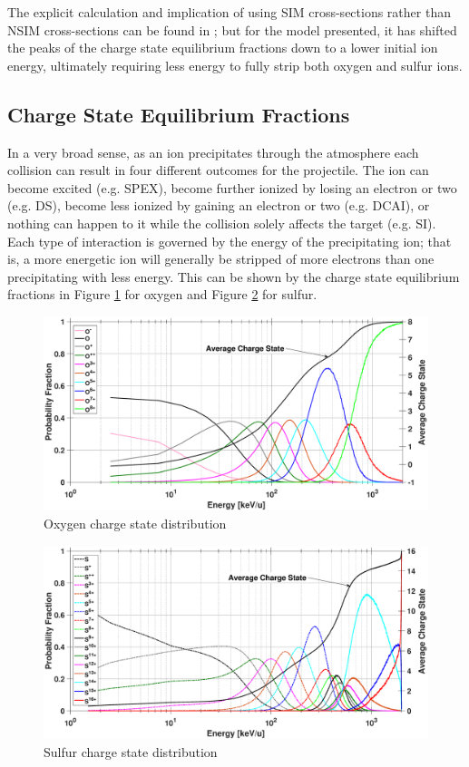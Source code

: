 \documentclass[draft]{agujournal2018}
\begin{document}
The explicit calculation and implication of using SIM cross-sections rather than NSIM cross-sections can be found in \citet{schultz2018}; but for the model presented, it has shifted the peaks of the charge state equilibrium fractions down to a lower initial ion energy, ultimately requiring less energy to fully strip both oxygen and sulfur ions.

\subsection{Charge State Equilibrium Fractions}

In a very broad sense, as an ion precipitates through the atmosphere each collision can result in four different outcomes for the projectile.
The ion can become excited (e.g. SPEX), become further ionized by losing an electron or two (e.g. DS), become less ionized by gaining an electron or two (e.g. DCAI), or nothing can happen to it while the collision solely affects the target (e.g. SI).
Each type of interaction is governed by the energy of the precipitating ion; that is, a more energetic ion will generally be stripped of more electrons than one precipitating with less energy.
This can be shown by the charge state equilibrium fractions in Figure \ref{fig:CSDoxy} for oxygen and Figure \ref{fig:CSDsul} for sulfur.

\begin{figure}[ht]
\centering
\includegraphics[width=\textwidth]{Figures/CSDoxy.eps}
\caption{Oxygen charge state distribution}
\label{fig:CSDoxy}
\end{figure}

\begin{figure}[ht]
\centering
\includegraphics[width=\textwidth]{Figures/CSDsul.eps}
\caption{Sulfur charge state distribution}
\label{fig:CSDsul}
\end{figure}
\end{document}
